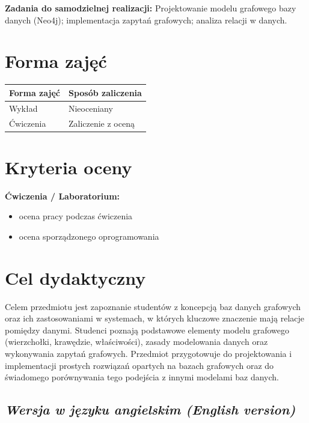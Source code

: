 \documentclass[12pt, a4paper]{article}
\newcommand{\thdrule}{\noalign{\global\setlength{\extrarowheight}{0pt}}}
\newcommand{\thdend}{\noalign{\global\setlength{\extrarowheight}{3pt}}}
\begin{document}
\vspace{4pt}
\noindent\textbf{Zadania do samodzielnej realizacji:} Projektowanie modelu grafowego bazy danych (Neo4j); implementacja zapytań grafowych; analiza relacji w danych.

\section{Forma zajęć}

\begin{center}
{\scriptsize
\begin{tabular}{m{5cm}m{8cm}}
\thdrule\toprule
\rowcolor{pjatkRed} {\color{white}\textbf{Forma zajęć}} & {\color{white}\textbf{Sposób zaliczenia}} \\
\midrule\thdend
  \rowcolor{tableRowLight} Wykład & Nieoceniany \\
  \rowcolor{tableRowAlt} Ćwiczenia & Zaliczenie z oceną \\
\bottomrule
\end{tabular}}
\end{center}

\section{Kryteria oceny}

\textbf{Ćwiczenia / Laboratorium:}
\begin{itemize}
  \item ocena pracy podczas ćwiczenia
  \item ocena sporządzonego oprogramowania
\end{itemize}


\section{Cel dydaktyczny}

Celem przedmiotu jest zapoznanie studentów z koncepcją baz danych grafowych oraz ich zastosowaniami w systemach, w których kluczowe znaczenie mają relacje pomiędzy danymi. Studenci poznają podstawowe elementy modelu grafowego (wierzchołki, krawędzie, właściwości), zasady modelowania danych oraz wykonywania zapytań grafowych. Przedmiot przygotowuje do projektowania i implementacji prostych rozwiązań opartych na bazach grafowych oraz do świadomego porównywania tego podejścia z innymi modelami baz danych.

\subsection*{\textit{Wersja w języku angielskim (English version)}}
\end{document}

